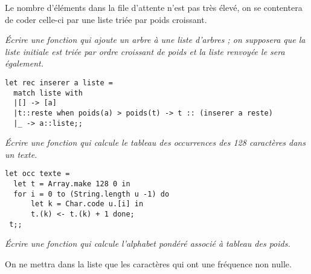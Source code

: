 Le nombre d'éléments dans la file d'attente n'est pas très élevé, on se contentera de coder celle-ci par une liste triée par poids croissant.
\begin{Exercise}[title = Insertion]\it 
Écrire une fonction  qui ajoute un arbre à une liste d'arbres ; on supposera que la liste initiale est triée par ordre croissant de poids et la liste renvoyée le sera également.
\end{Exercise}
\begin{Answer}
\begin{lstlisting}
let rec inserer a liste = 
  match liste with
  |[] -> [a]
  |t::reste when poids(a) > poids(t) -> t :: (inserer a reste)
  |_ -> a::liste;;
\end{lstlisting}
\end{Answer}
\begin{Exercise}[title = Calcul des poids, label =ques:tableOcc]\it 
Écrire une fonction  qui calcule le tableau des occurrences des 128 caractères dans un texte.
\end{Exercise}
\begin{Answer}
\begin{lstlisting}
let occ texte = 
  let t = Array.make 128 0 in
  for i = 0 to (String.length u -1) do
      let k = Char.code u.[i] in
      t.(k) <- t.(k) + 1 done;
 t;;
\end{lstlisting}
\end{Answer}
\begin{Exercise}[title = Calcul de l'alphabet]\it 
Écrire une fonction  qui calcule l'alphabet pondéré associé à tableau des poids.

On ne mettra dans la liste que les caractères qui ont une fréquence non nulle.
\end{Exercise}
